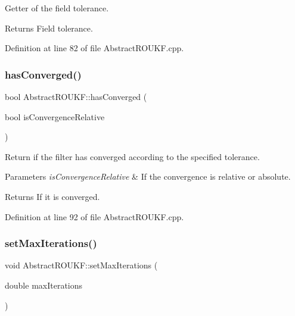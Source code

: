 Getter of the field {\ttfamily tolerance}. \begin{DoxyReturn}{Returns}
Field {\ttfamily tolerance}. 
\end{DoxyReturn}


Definition at line 82 of file Abstract\+R\+O\+U\+K\+F.\+cpp.

\mbox{\label{classAbstractROUKF_a7f9deb98273cfc2282e2902cdf716bff}} 
\subsubsection{\texorpdfstring{has\+Converged()}{hasConverged()}}
{\footnotesize\ttfamily bool Abstract\+R\+O\+U\+K\+F\+::has\+Converged (\begin{DoxyParamCaption}\item[{bool}]{is\+Convergence\+Relative }\end{DoxyParamCaption})}

Return if the filter has converged according to the specified {\ttfamily tolerance}. 
\begin{DoxyParams}{Parameters}
{\em is\+Convergence\+Relative} & If the convergence is relative or absolute. \\
\hline
\end{DoxyParams}
\begin{DoxyReturn}{Returns}
If it is converged. 
\end{DoxyReturn}


Definition at line 92 of file Abstract\+R\+O\+U\+K\+F.\+cpp.

\mbox{\label{classAbstractROUKF_affbf7bade0ebe7441377f88e6461e84f}} 
\subsubsection{\texorpdfstring{set\+Max\+Iterations()}{setMaxIterations()}}
{\footnotesize\ttfamily void Abstract\+R\+O\+U\+K\+F\+::set\+Max\+Iterations (\begin{DoxyParamCaption}\item[{double}]{max\+Iterations }\end{DoxyParamCaption})}

